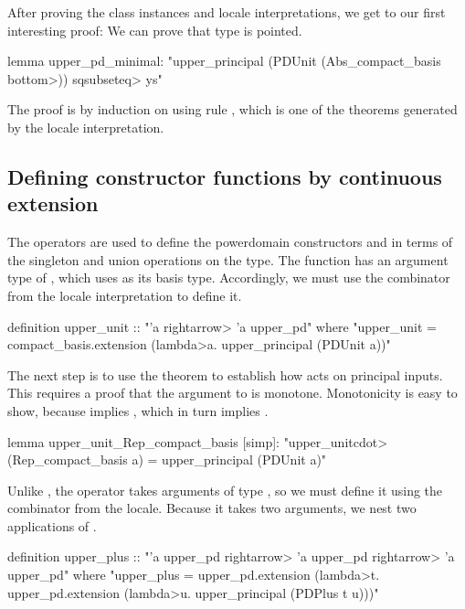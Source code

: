 After proving the class instances and locale interpretations, we get to our first interesting proof: We can prove that type  is pointed.
%
\begin{isacode}
lemma upper_pd_minimal:
  "upper_principal (PDUnit (Abs_compact_basis \<bottom>)) \<sqsubseteq> ys"
\end{isacode}
%
The proof is by induction on  using rule , which is one of the theorems generated by the locale interpretation.

\subsection{Defining constructor functions by continuous extension}
\label{sec:pd-constructors}

The  operators are used to define the powerdomain constructors  and  in terms of the singleton and union operations on the  type. The function  has an argument type of , which uses  as its basis type. Accordingly, we must use the  combinator from the  locale interpretation to define it.
%
\begin{isacode}
definition upper_unit :: "'a \<rightarrow> 'a upper_pd"
  where "upper_unit =
    compact_basis.extension (\<lambda>a. upper_principal (PDUnit a))"
\end{isacode}
%
The next step is to use the theorem  to establish how  acts on principal inputs. This requires a proof that the argument to  is monotone. Monotonicity is easy to show, because  implies , which in turn implies  .
%
\begin{isacode}
lemma upper_unit_Rep_compact_basis [simp]:
  "upper_unit\<cdot>(Rep_compact_basis a) = upper_principal (PDUnit a)"
\end{isacode}
%
Unlike , the operator  takes arguments of type , so we must define it using the  combinator from the  locale. Because it takes two arguments, we nest two applications of .
%
\begin{isacode}
definition upper_plus :: "'a upper_pd \<rightarrow> 'a upper_pd \<rightarrow> 'a upper_pd"
  where "upper_plus = upper_pd.extension (\<lambda>t.
    upper_pd.extension (\<lambda>u. upper_principal (PDPlus t u)))"
\end{isacode}
